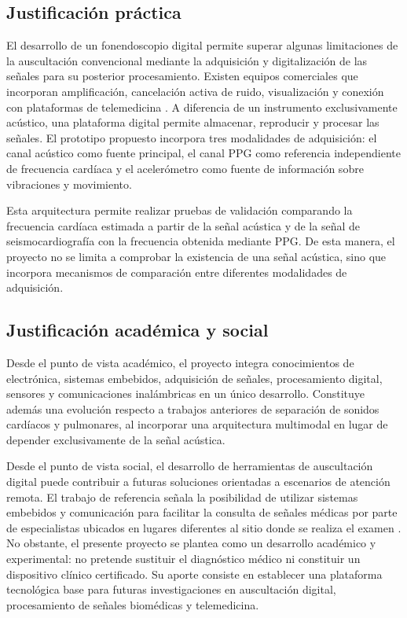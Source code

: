 \subsection{Justificación práctica}

El desarrollo de un fonendoscopio digital permite superar algunas limitaciones de la auscultación convencional mediante la adquisición y digitalización de las señales para su posterior procesamiento. Existen equipos comerciales que incorporan amplificación, cancelación activa de ruido, visualización y conexión con plataformas de telemedicina . A diferencia de un instrumento exclusivamente acústico, una plataforma digital permite almacenar, reproducir y procesar las señales. El prototipo propuesto incorpora tres modalidades de adquisición: el canal acústico como fuente principal, el canal PPG como referencia independiente de frecuencia cardíaca y el acelerómetro como fuente de información sobre vibraciones y movimiento.

Esta arquitectura permite realizar pruebas de validación comparando la frecuencia cardíaca estimada a partir de la señal acústica y de la señal de seismocardiografía con la frecuencia obtenida mediante PPG. De esta manera, el proyecto no se limita a comprobar la existencia de una señal acústica, sino que incorpora mecanismos de comparación entre diferentes modalidades de adquisición.

\subsection{Justificación académica y social}

Desde el punto de vista académico, el proyecto integra conocimientos de electrónica, sistemas embebidos, adquisición de señales, procesamiento digital, sensores y comunicaciones inalámbricas en un único desarrollo. Constituye además una evolución respecto a trabajos anteriores de separación de sonidos cardíacos y pulmonares, al incorporar una arquitectura multimodal en lugar de depender exclusivamente de la señal acústica.

Desde el punto de vista social, el desarrollo de herramientas de auscultación digital puede contribuir a futuras soluciones orientadas a escenarios de atención remota. El trabajo de referencia señala la posibilidad de utilizar sistemas embebidos y comunicación para facilitar la consulta de señales médicas por parte de especialistas ubicados en lugares diferentes al sitio donde se realiza el examen . No obstante, el presente proyecto se plantea como un desarrollo académico y experimental: no pretende sustituir el diagnóstico médico ni constituir un dispositivo clínico certificado. Su aporte consiste en establecer una plataforma tecnológica base para futuras investigaciones en auscultación digital, procesamiento de señales biomédicas y telemedicina.


